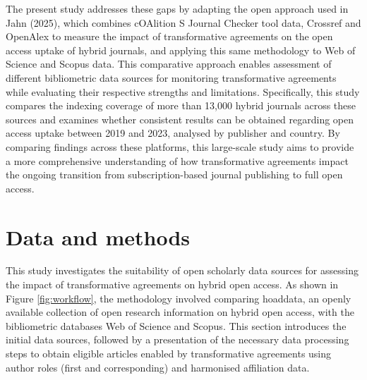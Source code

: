 \documentclass[a4paper,man,floatsintext,longtable,noextraspace,10pt]{apa6}
\begin{document}
The present study addresses these gaps by adapting the open approach
used in Jahn (2025), which combines cOAlition S Journal Checker tool
data, Crossref and OpenAlex to measure the impact of transformative
agreements on the open access uptake of hybrid journals, and applying
this same methodology to Web of Science and Scopus data. This
comparative approach enables assessment of different bibliometric data
sources for monitoring transformative agreements while evaluating their
respective strengths and limitations. Specifically, this study compares
the indexing coverage of more than 13,000 hybrid journals across these
sources and examines whether consistent results can be obtained
regarding open access uptake between 2019 and 2023, analysed by
publisher and country. By comparing findings across these platforms,
this large-scale study aims to provide a more comprehensive
understanding of how transformative agreements impact the ongoing
transition from subscription-based journal publishing to full open
access.

\section{Data and methods}\label{data-and-methods}

This study investigates the suitability of open scholarly data sources
for assessing the impact of transformative agreements on hybrid open
access. As shown in Figure \ref{fig:workflow}, the methodology involved
comparing hoaddata, an openly available collection of open research
information on hybrid open access, with the bibliometric databases Web
of Science and Scopus. This section introduces the initial data sources,
followed by a presentation of the necessary data processing steps to
obtain eligible articles enabled by transformative agreements using
author roles (first and corresponding) and harmonised affiliation data.
\end{document}

